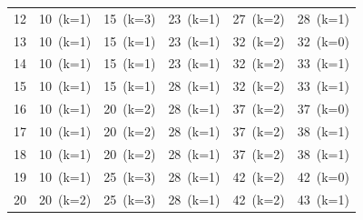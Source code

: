 \documentclass[12pt]{article}
\begin{document}
\begin{landscape}
\begin{longtable}{cccccc}
12 & \cellcolor{green!40}10~(k=1) & \cellcolor{green!40}15~(k=3) & \cellcolor{green!40}23~(k=1) & \cellcolor{green!40}27~(k=2) & \cellcolor{green!40}28~(k=1) \\
13 & \cellcolor{green!40}10~(k=1) & \cellcolor{yellow!50}15~(k=1) & \cellcolor{green!40}23~(k=1) & \cellcolor{green!40}32~(k=2) & \cellcolor{red!20}32~(k=0) \\
14 & \cellcolor{green!40}10~(k=1) & \cellcolor{yellow!50}15~(k=1) & \cellcolor{green!40}23~(k=1) & \cellcolor{green!40}32~(k=2) & \cellcolor{green!40}33~(k=1) \\
15 & \cellcolor{green!40}10~(k=1) & \cellcolor{yellow!50}15~(k=1) & \cellcolor{green!40}28~(k=1) & \cellcolor{green!40}32~(k=2) & \cellcolor{green!40}33~(k=1) \\
16 & \cellcolor{green!40}10~(k=1) & \cellcolor{green!40}20~(k=2) & \cellcolor{green!40}28~(k=1) & \cellcolor{green!40}37~(k=2) & \cellcolor{red!20}37~(k=0) \\
17 & \cellcolor{green!40}10~(k=1) & \cellcolor{green!40}20~(k=2) & \cellcolor{green!40}28~(k=1) & \cellcolor{green!40}37~(k=2) & \cellcolor{green!40}38~(k=1) \\
18 & \cellcolor{green!40}10~(k=1) & \cellcolor{green!40}20~(k=2) & \cellcolor{green!40}28~(k=1) & \cellcolor{green!40}37~(k=2) & \cellcolor{green!40}38~(k=1) \\
19 & \cellcolor{green!40}10~(k=1) & \cellcolor{green!40}25~(k=3) & \cellcolor{green!40}28~(k=1) & \cellcolor{green!40}42~(k=2) & \cellcolor{red!20}42~(k=0) \\
20 & \cellcolor{green!40}20~(k=2) & \cellcolor{green!40}25~(k=3) & \cellcolor{green!40}28~(k=1) & \cellcolor{green!40}42~(k=2) & \cellcolor{green!40}43~(k=1) \\
\bottomrule
\end{longtable}
\end{landscape}
\end{document}
